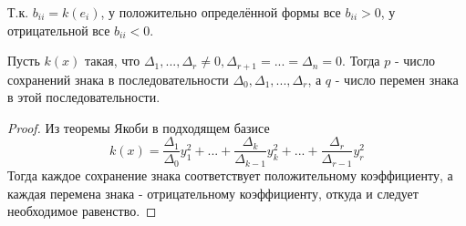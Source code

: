 \begin{remark}
    Т.к. $b_{ii} = k(e_i)$, у положительно определённой формы все $b_{ii} > 0$, у отрицательной все $b_{ii} < 0$.
\end{remark}
\begin{remark}
    Пусть $k(x)$ такая, что $\Delta_1,...,\Delta_r \neq 0, \Delta_{r+1} = ... = \Delta_n = 0$. Тогда $p$ - число сохранений знака в последовательности $\Delta_0,\Delta_1,...,\Delta_r$, а $q$ - число перемен знака в этой последовательности.
\end{remark}
\begin{proof}
    Из теоремы Якоби в подходящем базисе
    $$k(x) = \frac{\Delta_1}{\Delta_0}y_1^2 + ... + \frac{\Delta_k}{\Delta_{k-1}}y_k^2 + ... + \frac{\Delta_r}{\Delta_{r-1}}y_r^2$$
    Тогда каждое сохранение знака соответствует положительному коэффициенту, а каждая перемена знака - отрицательному коэффициенту, откуда и следует необходимое равенство. 
\end{proof}
